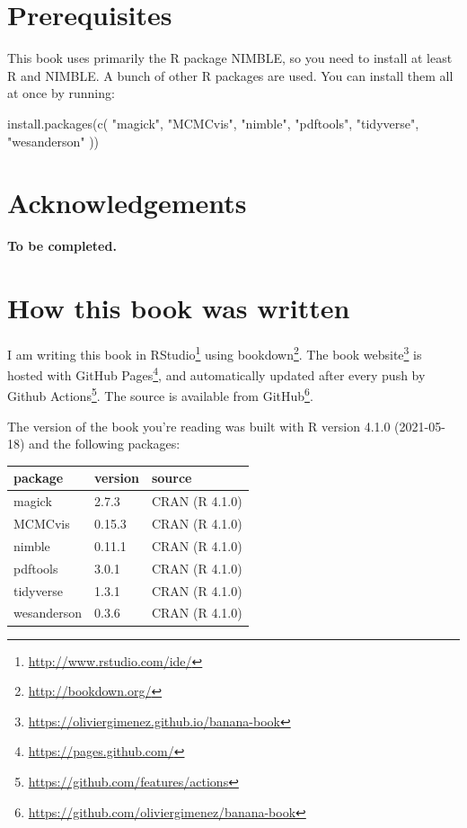 \documentclass[
  12pt,
]{krantz}
\newenvironment{Shaded}{\begin{snugshade}}{\end{snugshade}}
\newcommand{\FunctionTok}[1]{\textcolor[rgb]{0.00,0.00,0.00}{#1}}
\newcommand{\NormalTok}[1]{#1}
\newcommand{\StringTok}[1]{\textcolor[rgb]{0.31,0.60,0.02}{#1}}
\renewcommand{\href}[2]{#2\footnote{\url{#1}}}
\begin{document}
\hypertarget{prerequisites}{%
\section*{Prerequisites}\label{prerequisites}}


This book uses primarily the R package NIMBLE, so you need to install at least R and NIMBLE. A bunch of other R packages are used. You can install them all at once by running:

\begin{Shaded}
\begin{Highlighting}[]
\FunctionTok{install.packages}\NormalTok{(}\FunctionTok{c}\NormalTok{(}
  \StringTok{"magick"}\NormalTok{, }\StringTok{"MCMCvis"}\NormalTok{, }\StringTok{"nimble"}\NormalTok{, }\StringTok{"pdftools"}\NormalTok{, }
  \StringTok{"tidyverse"}\NormalTok{, }\StringTok{"wesanderson"} 
\NormalTok{))}
\end{Highlighting}
\end{Shaded}

\hypertarget{acknowledgements}{%
\section*{Acknowledgements}\label{acknowledgements}}


\textbf{To be completed.}

\hypertarget{how-this-book-was-written}{%
\section*{How this book was written}\label{how-this-book-was-written}}


I am writing this book in \href{http://www.rstudio.com/ide/}{RStudio} using \href{http://bookdown.org/}{bookdown}. The \href{https://oliviergimenez.github.io/banana-book}{book website} is hosted with \href{https://pages.github.com/}{GitHub Pages}, and automatically updated after every push by \href{https://github.com/features/actions}{Github Actions}. The source is available from \href{https://github.com/oliviergimenez/banana-book}{GitHub}.

The version of the book you're reading was built with R version 4.1.0 (2021-05-18) and the following packages:

\begin{longtable}[]{@{}lll@{}}
\toprule
package & version & source \\
\midrule
\endhead
magick & 2.7.3 & CRAN (R 4.1.0) \\
MCMCvis & 0.15.3 & CRAN (R 4.1.0) \\
nimble & 0.11.1 & CRAN (R 4.1.0) \\
pdftools & 3.0.1 & CRAN (R 4.1.0) \\
tidyverse & 1.3.1 & CRAN (R 4.1.0) \\
wesanderson & 0.3.6 & CRAN (R 4.1.0) \\
\bottomrule
\end{longtable}
\end{document}
